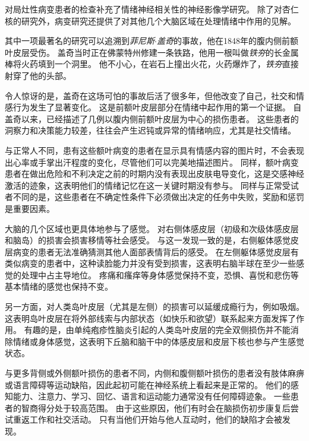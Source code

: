 \begin{proposition}[情绪损伤研究] \label{box:42_2}
	
	\quad \quad 对局灶性病变患者的检查补充了情绪神经相关性的神经影像学研究。
	除了对杏仁核的研究外，病变研究还提供了对其他几个大脑区域在处理情绪中作用的见解。
	
	\quad \quad 其中一项最著名的研究可以追溯到\textit{菲尼斯$\cdot$盖奇}的事故，他在1848年的腹内侧前额叶皮层受伤。
	盖奇当时正在佛蒙特州修建一条铁路，他用一根叫做\textit{铁夯}的长金属棒将火药填到一个洞里。
	他不小心，在岩石上撞出火花，火药爆炸了，\textit{铁夯}直接射穿了他的头部。
	
	\quad \quad 令人惊讶的是，盖奇在这场可怕的事故后活了很多年，但他改变了自己，社交和情感行为发生了显著变化。
	这是前额叶皮层部分在情绪中起作用的第一个证据。
	自盖奇以来，已经描述了几例以腹内侧前额叶皮层为中心的损伤患者。
	这些患者的洞察力和决策能力较差，往往会产生迟钝或异常的情绪响应，尤其是社交情绪。
	
	\quad \quad 与正常人不同，患有这些额叶病变的患者在显示具有情感内容的图片时，不会表现出心率或手掌出汗程度的变化，尽管他们可以完美地描述图片。
	同样，额叶病变患者在做出危险和不利决定之前的时期内没有表现出皮肤电导变化，这是交感神经激活的迹象，这表明他们的情绪记忆在这一关键时期没有参与。
	同样与正常受试者不同的是，这些患者在不确定性条件下必须做出决定的任务中失败，奖励和惩罚是重要因素。
	
	\quad \quad 大脑的几个区域也更具体地参与了感觉。
	对右侧体感皮层（初级和次级体感皮层和脑岛）的损害会损害移情等社会感受。
	与这一发现一致的是，右侧躯体感觉皮层病变的患者无法准确猜测其他人面部表情背后的感受。
	在左侧躯体感觉皮层有类似病变的患者中，这种读脸能力并没有受到损害，这表明右脑半球在至少一些感觉的处理中占主导地位。
	疼痛和瘙痒等身体感觉保持不变，恐惧、喜悦和悲伤等基本情绪的感觉也保持不变。
	
	\quad \quad 另一方面，对人类岛叶皮层（尤其是左侧）的损害可以延缓成瘾行为，例如吸烟。
	这表明岛叶皮层在将外部线索与内部状态（如快乐和欲望）联系起来方面发挥了作用。
	有趣的是，由单纯疱疹性脑炎引起的人类岛叶皮层的完全双侧损伤并不能消除情绪或身体感觉，这表明下丘脑和脑干中的体感皮层和皮层下核也参与产生感觉状态。
	
\end{proposition}


与更多背侧或外侧额叶损伤的患者不同，内侧和腹侧额叶损伤的患者没有肢体麻痹或语言障碍等运动缺陷，因此起初可能在神经系统上看起来是正常的。
他们的感知能力、注意力、学习、回忆、语言和运动能力通常没有任何障碍迹象。
一些患者的智商得分处于较高范围。
由于这些原因，他们有时会在脑损伤初步康复后尝试重返工作和社交活动。
只有当他们开始与他人互动时，他们的缺陷才会被发现。


